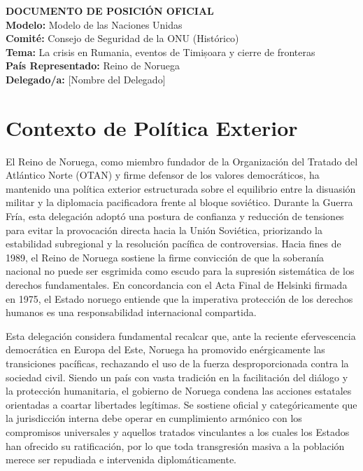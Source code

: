 \documentclass[11pt,a4paper]{article}
\begin{document}
\begin{center}
    \textbf{\Large DOCUMENTO DE POSICIÓN OFICIAL}\\[0.5cm]
    \textbf{Modelo:} Modelo de las Naciones Unidas\\
    \textbf{Comité:} Consejo de Seguridad de la ONU (Histórico)\\
    \textbf{Tema:} La crisis en Rumania, eventos de Timișoara y cierre de fronteras\\
    \textbf{País Representado:} Reino de Noruega\\
    \textbf{Delegado/a:} [Nombre del Delegado]
\end{center}

\vspace{0.5cm}

\section*{Contexto de Política Exterior}
El Reino de Noruega, como miembro fundador de la Organización del Tratado del Atlántico Norte (OTAN) y firme defensor de los valores democráticos, ha mantenido una política exterior estructurada sobre el equilibrio entre la disuasión militar y la diplomacia pacificadora frente al bloque soviético. Durante la Guerra Fría, esta delegación adoptó una postura de confianza y reducción de tensiones para evitar la provocación directa hacia la Unión Soviética, priorizando la estabilidad subregional y la resolución pacífica de controversias. Hacia fines de 1989, el Reino de Noruega sostiene la firme convicción de que la soberanía nacional no puede ser esgrimida como escudo para la supresión sistemática de los derechos fundamentales. En concordancia con el Acta Final de Helsinki firmada en 1975, el Estado noruego entiende que la imperativa protección de los derechos humanos es una responsabilidad internacional compartida.

Esta delegación considera fundamental recalcar que, ante la reciente efervescencia democrática en Europa del Este, Noruega ha promovido enérgicamente las transiciones pacíficas, rechazando el uso de la fuerza desproporcionada contra la sociedad civil. Siendo un país con vasta tradición en la facilitación del diálogo y la protección humanitaria, el gobierno de Noruega condena las acciones estatales orientadas a coartar libertades legítimas. Se sostiene oficial y categóricamente que la jurisdicción interna debe operar en cumplimiento armónico con los compromisos universales y aquellos tratados vinculantes a los cuales los Estados han ofrecido su ratificación, por lo que toda transgresión masiva a la población merece ser repudiada e intervenida diplomáticamente.
\end{document}
